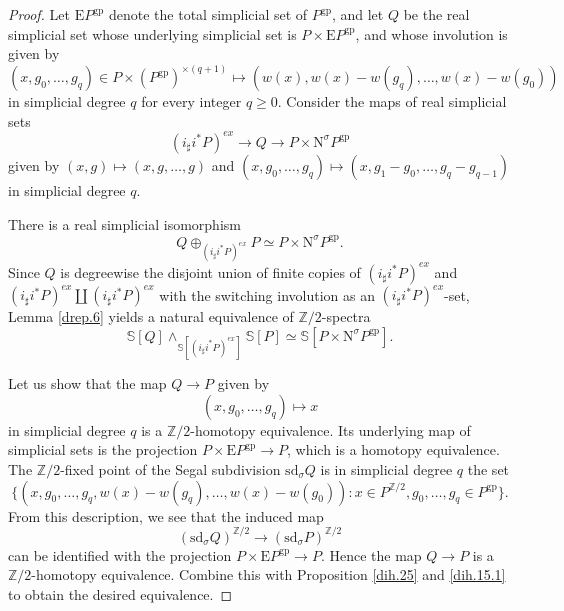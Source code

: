 \documentclass[10pt,a4paper]{amsart}
\newcommand{\Nsigma}{\mathrm{N}^\sigma}
\newcommand{\Sphere}{\mathbb{S}}
\newcommand{\Ztwo}{{\mathbb{Z}/2}}
\newcommand{\gp}{\mathrm{gp}}
\newcommand{\rE}{\mathrm{E}}
\newcommand{\sd}{\mathrm{sd}}
\begin{document}
\begin{proof}
Let $\rE P^\gp$ denote the total simplicial set of $P^\gp$,
and let $Q$ be the real simplicial set whose underlying simplicial set is $P\times \rE P^\gp$,
and whose involution is given by
\[
(x,g_0,\ldots,g_q)\in P\times (P^\gp)^{\times(q+1)}
\mapsto
(w(x),w(x)-w(g_q),\ldots,w(x)-w(g_0))
\]
in simplicial degree $q$ for every integer $q\geq 0$.
Consider the maps of real simplicial sets
\[
(i_\sharp i^* P)^{ex} \to Q \to P\times \Nsigma P^\gp
\]
given by
$
(x,g)
\mapsto
(x,g,\ldots,g)
$
and
$
(x,g_0,\ldots,g_q)
\mapsto
(x,g_1-g_0,\ldots,g_q-g_{q-1})
$
in simplicial degree $q$.

There is a real simplicial isomorphism
\[
Q \oplus_{(i_\sharp i^*P)^{ex}} P
\simeq
P\times \Nsigma P^\gp.
\]
Since $Q$ is degreewise the disjoint union of finite copies of $(i_\sharp i^*P)^{ex}$ and $(i_\sharp i^*P)^{ex}\amalg (i_\sharp i^*P)^{ex}$ with the switching involution as an $(i_\sharp i^*P)^{ex}$-set, Lemma \ref{drep.6} yields a natural equivalence of $\Ztwo$-spectra
\begin{equation}
\label{dih.15.1}
\Sphere[Q] \wedge_{\Sphere[(i_\sharp i^*P)^{ex}]} \Sphere[P]
\simeq
\Sphere[P\times \Nsigma P^\gp].
\end{equation}

Let us show that the map $Q\to P$ given by
\[
(x,g_0,\ldots,g_q)\mapsto x
\]
in simplicial degree $q$ is a $\Ztwo$-homotopy equivalence. Its underlying map of simplicial sets is the projection $P\times \rE P^\gp \to P$, which is a homotopy equivalence.
The $\Ztwo$-fixed point of the Segal subdivision $\sd_{\sigma} Q$ is in simplicial degree $q$ the set
\[
\{
(x,g_0,\ldots,g_q,w(x)-w(g_q),\ldots,w(x)-w(g_0))
:
x\in P^{\Ztwo},g_0,\ldots,g_q\in P^\gp
\}.
\]
From this description,
we see that the induced map
\[
(\sd_{\sigma} Q)^{\Ztwo}
\to
(\sd_{\sigma} P)^{\Ztwo}
\]
can be identified with the projection $P\times \rE P^\gp \to P$.
Hence the map $Q\to P$ is a $\Ztwo$-homotopy equivalence.
Combine this with Proposition \ref{dih.25} and \eqref{dih.15.1} to obtain the desired equivalence.
\end{proof}
\end{document}

